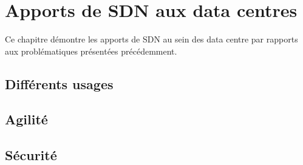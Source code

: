 \chapter{Apports de SDN aux data centres}
Ce chapitre démontre les apports de SDN au sein des data centre par rapports aux problématiques présentées précédemment.

\section{Différents usages}

\section{Agilité}

\section{Sécurité}
